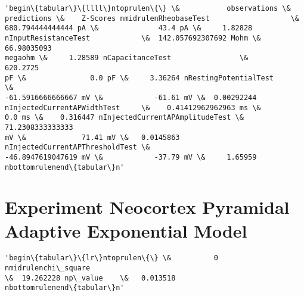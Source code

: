             \begin{tcolorbox}[breakable, size=fbox, boxrule=.5pt, pad at break*=1mm, opacityfill=0]
\begin{Verbatim}[commandchars=\\\{\}]
'begin\{tabular\}\{llll\}ntoprulen\{\} \&           observations \&
predictions \&    Z-Scores nmidrulenRheobaseTest                   \&
680.794444444444 pA \&              43.4 pA \&     1.82828
nInputResistanceTest            \&  142.057692307692 Mohm \&  66.98035093
megaohm \&     1.28589 nCapacitanceTest                \&            620.2725
pF \&               0.0 pF \&     3.36264 nRestingPotentialTest           \&
-61.5916666666667 mV \&            -61.61 mV \&  0.00292244
nInjectedCurrentAPWidthTest     \&    0.41412962962963 ms \&
0.0 ms \&    0.316447 nInjectedCurrentAPAmplitudeTest \&    71.2308333333333
mV \&             71.41 mV \&   0.0145863 nInjectedCurrentAPThresholdTest \&
-46.8947619047619 mV \&            -37.79 mV \&     1.65959
nbottomrulenend\{tabular\}n'
\end{Verbatim}
\end{tcolorbox}
        
    \hypertarget{experiment-neocortex-pyramidal-adaptive-exponential-model}{%
\section{Experiment Neocortex Pyramidal Adaptive Exponential
Model}\label{experiment-neocortex-pyramidal-adaptive-exponential-model}}



            \begin{tcolorbox}[breakable, size=fbox, boxrule=.5pt, pad at break*=1mm, opacityfill=0]
\begin{Verbatim}[commandchars=\\\{\}]
'begin\{tabular\}\{lr\}ntoprulen\{\} \&          0 nmidrulenchi\_square
\&  19.262228 np\_value    \&   0.013518
nbottomrulenend\{tabular\}n'
\end{Verbatim}
\end{tcolorbox}
        
